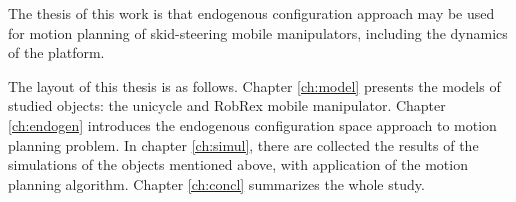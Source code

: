 The thesis of this work is that endogenous configuration approach may be used for
motion planning of skid-steering mobile manipulators, including the dynamics of the platform.

The layout of this thesis is as follows. Chapter \ref{ch:model} presents the models of studied
objects: the unicycle and RobRex mobile manipulator. Chapter \ref{ch:endogen} introduces the endogenous
configuration space approach to motion planning problem. In chapter \ref{ch:simul}, there are collected
the results of the simulations of the objects mentioned above, with application of the motion
planning algorithm. Chapter \ref{ch:concl} summarizes the whole study.
